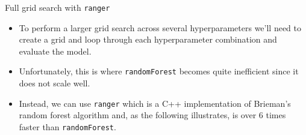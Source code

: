 \documentclass[
  10pt,
  ignorenonframetext,
]{beamer}
\providecommand{\tightlist}{%
  \setlength{\itemsep}{0pt}\setlength{\parskip}{0pt}}
\begin{document}
\begin{frame}[fragile]{Full grid search with \texttt{ranger}}
\protect\hypertarget{full-grid-search-with-ranger}{}

\begin{itemize}
\tightlist
\item
  To perform a larger grid search across several hyperparameters we'll
  need to create a grid and loop through each hyperparameter combination
  and evaluate the model.
\item
  Unfortunately, this is where \texttt{randomForest} becomes quite
  inefficient since it does not scale well.
\item
  Instead, we can use \texttt{ranger} which is a C++ implementation of
  Brieman's random forest algorithm and, as the following illustrates,
  is over 6 times faster than \texttt{randomForest}.
\end{itemize}

\end{frame}
\end{document}
